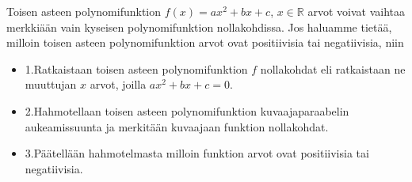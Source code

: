 Toisen asteen polynomifunktion $f(x)=ax^2+bx+c$, $x \in \mathbb{R}$ arvot voivat vaihtaa merkkiään vain kyseisen polynomifunktion nollakohdissa. Jos haluamme tietää, milloin toisen asteen polynomifunktion arvot ovat positiivisia tai negatiivisia, niin
\begin{itemize}
\item{1.Ratkaistaan toisen asteen polynomifunktion $f$ nollakohdat eli ratkaistaan ne muuttujan $x$ arvot, joilla $ax^2+bx+c=0$. }
\item{2.Hahmotellaan toisen asteen polynomifunktion kuvaajaparaabelin aukeamissuunta ja merkitään kuvaajaan funktion nollakohdat.}
\item{3.Päätellään hahmotelmasta milloin funktion arvot ovat positiivisia tai negatiivisia.}
\end{itemize} 

